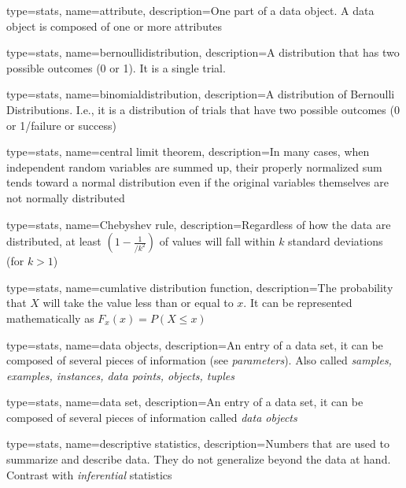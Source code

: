 

{
	type=stats,
    name=attribute,
    description={One part of a data object.  A data object is composed of one or more attributes}
}

{
	type=stats,
    name=bernoullidistribution,
    description={A distribution that has two possible outcomes (0 or 1).  It is a single trial.}
}

{
	type=stats,
    name=binomialdistribution,
    description={A distribution of Bernoulli Distributions.  I.e., it is a distribution of trials that have two possible outcomes (0 or 1/failure or success)}
}

{
	type=stats,
    name=central limit theorem,
    description={In many cases, when independent random variables are summed up, their properly normalized sum tends toward a normal distribution even if the original variables themselves are not normally distributed}
}

{
	type=stats,
    name=Chebyshev rule,
    description={Regardless of how the data are distributed, at least $\left(1-\frac{1}{/k^2}\right)$ of values will fall within $k$ standard deviations (for $k>1$)}
}

{
	type=stats,
    name=cumlative distribution function,
    description={The probability that $X$ will take the value less than or equal to $x$.  It can be represented mathematically as $F_x\left(x\right)=P\left(X\leq{}x\right)$}
}

{
	type=stats,
    name=data objects,
    description={An entry of a data set, it can be composed of several pieces of information (see \textit{parameters}).  Also called \textit{samples, examples, instances, data points, objects, tuples}}
}

{
	type=stats,
    name=data set,
    description={An entry of a data set, it can be composed of several pieces of information called \textit{data objects}}
}

{
	type=stats,
    name=descriptive statistics,
    description={Numbers that are used to summarize and describe data.  They do not generalize beyond the data at hand.  Contrast with \textit{inferential} statistics}
}

